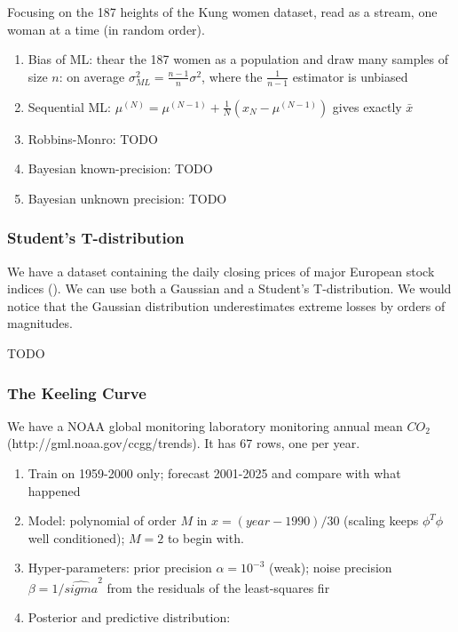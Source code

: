 \documentclass{article}
\begin{document}
Focusing on the 187 heights of the Kung women dataset, read as a stream,
one woman at a time (in random order).

\begin{enumerate}
\def\labelenumi{\arabic{enumi}.}
\item
  Bias of ML: thear the 187 women as a population and draw many samples
  of size \(n\): on average \(\sigma^2_{ML} = \frac{n-1}{n} \sigma^2\),
  where the \(\frac{1}{n-1}\) estimator is unbiased
\item
  Sequential ML:
  \(\mu^{(N)} = \mu^{(N - 1)} + \frac{1}{N} (x_N - \mu^{(N - 1)})\)
  gives exactly \(\bar{x}\)
\item
  Robbins-Monro: TODO
\item
  Bayesian known-precision: TODO
\item
  Bayesian unknown precision: TODO
\end{enumerate}

\subsubsection{Student's
T-distribution}\label{students-t-distribution-1}

We have a dataset containing the daily closing prices of major European
stock indices ().
We can use both a Gaussian and a Student's T-distribution. We would
notice that the Gaussian distribution underestimates extreme losses by
orders of magnitudes.

TODO

\subsubsection{The Keeling Curve}\label{the-keeling-curve}

We have a NOAA global monitoring laboratory monitoring annual mean
\(CO_2\) (http://gml.noaa.gov/ccgg/trends). It has 67 rows, one per
year.

\begin{enumerate}
\def\labelenumi{\arabic{enumi}.}
\item
  Train on 1959-2000 only; forecast 2001-2025 and compare with what
  happened
\item
  Model: polynomial of order \(M\) in \(x = (year - 1990)/30\) (scaling
  keeps \(\phi^T \phi\) well conditioned); \(M=2\) to begin with.
\item
  Hyper-parameters: prior precision \(\alpha = 10^{-3}\) (weak); noise
  precision \(\beta = 1 / \hat{sigma}^2\) from the residuals of the
  least-squares fir
\item
  Posterior and predictive distribution:
\end{enumerate}
\end{document}
